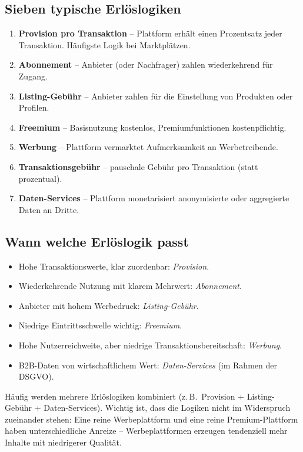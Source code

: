 \documentclass[11pt,a4paper,oneside]{article}
\newcommand{\fachbegriff}[1]{\textbf{#1}}
\begin{document}
\subsection{Sieben typische Erlöslogiken}

\begin{enumerate}
  \item \fachbegriff{Provision pro Transaktion} -- Plattform erhält einen Prozentsatz jeder Transaktion. Häufigste Logik bei Marktplätzen.
  \item \fachbegriff{Abonnement} -- Anbieter (oder Nachfrager) zahlen wiederkehrend für Zugang.
  \item \fachbegriff{Listing-Gebühr} -- Anbieter zahlen für die Einstellung von Produkten oder Profilen.
  \item \fachbegriff{Freemium} -- Basisnutzung kostenlos, Premiumfunktionen kostenpflichtig.
  \item \fachbegriff{Werbung} -- Plattform vermarktet Aufmerksamkeit an Werbetreibende.
  \item \fachbegriff{Transaktionsgebühr} -- pauschale Gebühr pro Transaktion (statt prozentual).
  \item \fachbegriff{Daten-Services} -- Plattform monetarisiert anonymisierte oder aggregierte Daten an Dritte.
\end{enumerate}

\subsection{Wann welche Erlöslogik passt}

\begin{itemize}
  \item Hohe Transaktionswerte, klar zuordenbar: \emph{Provision}.
  \item Wiederkehrende Nutzung mit klarem Mehrwert: \emph{Abonnement}.
  \item Anbieter mit hohem Werbedruck: \emph{Listing-Gebühr}.
  \item Niedrige Eintrittsschwelle wichtig: \emph{Freemium}.
  \item Hohe Nutzerreichweite, aber niedrige Transaktionsbereitschaft: \emph{Werbung}.
  \item B2B-Daten von wirtschaftlichem Wert: \emph{Daten-Services} (im Rahmen der DSGVO).
\end{itemize}

Häufig werden mehrere Erlöslogiken kombiniert (z.\,B.\ Provision + Listing-Gebühr + Daten-Services). Wichtig ist, dass die Logiken nicht im Widerspruch zueinander stehen: Eine reine Werbeplattform und eine reine Premium-Plattform haben unterschiedliche Anreize -- Werbeplattformen erzeugen tendenziell mehr Inhalte mit niedrigerer Qualität.
\end{document}
